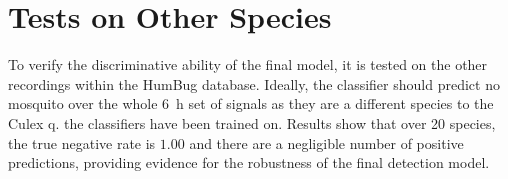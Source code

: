 \section{Tests on Other Species}
\label{sec:exp-other}
    To verify the discriminative ability of the final model, it is tested on the other recordings within the HumBug database. Ideally, the classifier should predict no mosquito over the whole \SI{6}{\hour} set of signals as they are a different species to the Culex q. the classifiers have been trained on. Results show that over 20 species, the true negative rate is $1.00$ and there are a negligible number of positive predictions, providing evidence for the robustness of the final detection model.